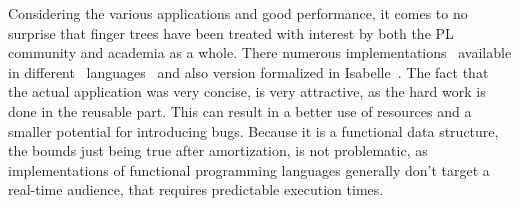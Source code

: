 Considering the various applications and good performance, it comes to no surprise that finger trees have been treated with interest by both the PL community and academia as a whole. There numerous implementations~\cite{Haskell} available in different~\cite{Scala} languages~\cite{OCaml} and also version formalized in Isabelle~\cite{Finger-Trees-AFP}. The fact that the actual application was very concise, is very attractive, as the hard work is done in the reusable part. This can result in a better use of resources and a smaller potential for introducing bugs. Because it is a functional data structure, the bounds just being true after amortization, is not problematic, as implementations of functional programming languages generally don't target a real-time audience, that requires predictable execution times.